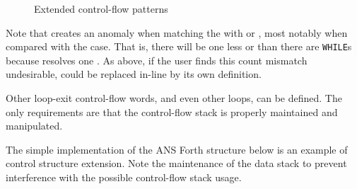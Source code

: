 \begin{figure}[ht]
  \begin{center}
	\caption{Extended control-flow patterns}
	\label{fig:extended}
  \end{center}
\end{figure}

Note that  creates an anomaly when matching the
 with  or , most notably when
compared with the  case. That is,
there will be one less  or  than there are
\texttt{WHILE}s because  resolves one . As
above, if the user finds this count mismatch undesirable, 
could be replaced in-line by its own definition.

Other loop-exit control-flow words, and even other loops, can be
defined. The only requirements are that the control-flow stack is
properly maintained and manipulated.

The simple implementation of the ANS Forth  structure
below is an example of control structure extension. Note the
maintenance of the data stack to prevent interference with the
possible control-flow stack usage.

